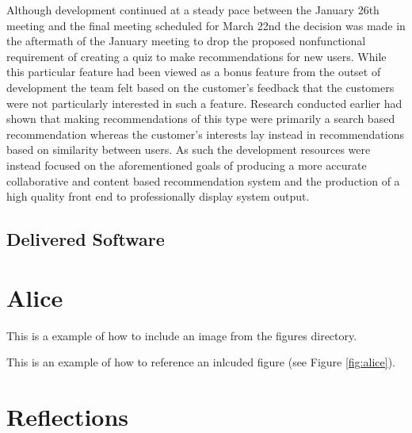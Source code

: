 \documentclass{l3proj}
\begin{document}
Although development continued at a steady pace between the January 26th meeting and the final meeting scheduled for March 22nd the decision was made in the aftermath of the January meeting to drop the proposed nonfunctional requirement of creating a quiz to make recommendations for new users. While this particular feature had been viewed as a bonus feature from the outset of development the team felt based on the customer’s feedback that the customers were not particularly interested in such a feature. Research conducted earlier had shown that making recommendations of this type were primarily a search based recommendation whereas the customer’s interests lay instead in recommendations based on similarity between users. As such the development resources were instead focused on the aforementioned goals of producing a more accurate collaborative and content based recommendation system and the production of a high quality front end to professionally display system output. 

\subsection{Delivered Software}
\label{finsoftware}

\newpage

\section{Alice}
\label{sec:alice}

This is a example of how to include an image from the figures directory.



This is an example of how to reference an inlcuded figure (see Figure \ref{fig:alice}).

\section{Reflections}
\label{sec:reflections}
\end{document}
